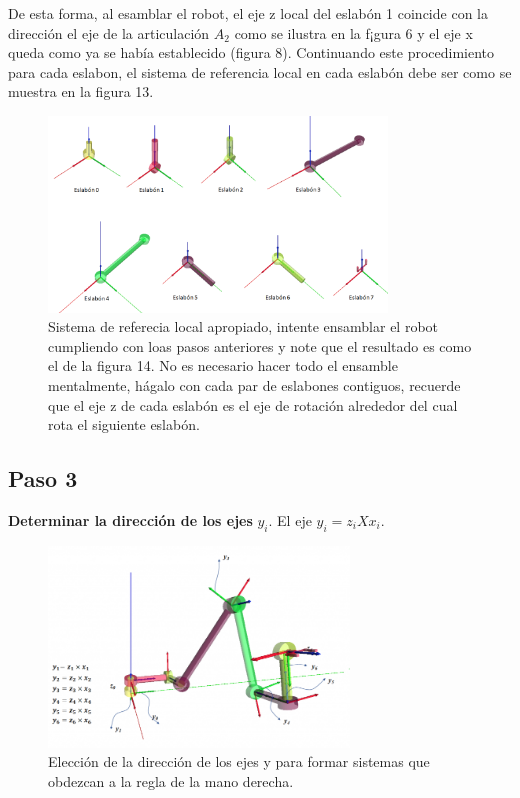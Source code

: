 \documentclass[12pt,a4paper]{report}
\begin{document}
De esta forma, al esamblar el robot,  el eje z local del eslabón 1 coincide con la dirección el eje de la articulación $A_{2}$ como se ilustra en la f¡gura 6 y el eje x queda como ya se había establecido (figura 8). Continuando este procedimiento para cada eslabon, el sistema de referencia local en cada eslabón debe ser como se muestra en la figura 13.

\begin{figure}[hbtp]
\centering
\includegraphics[width=9cm]{13.png}
\caption{Sistema de referecia local apropiado, intente ensamblar el robot cumpliendo con loas pasos anteriores y note que el resultado es como el de la figura 14. No es necesario hacer todo el ensamble mentalmente, hágalo con cada par de eslabones contiguos, recuerde que el eje z de cada eslabón es el eje de rotación alrededor del cual rota el siguiente eslabón.}
\end{figure}
\subsection{Paso 3}
\textbf{Determinar la dirección de los ejes} $y_{i}$.
El eje $y_{i}=z_{i}X x_{i}$.
\begin{figure}[hbtp]
\centering
\includegraphics[width=8cm]{14.png}
\caption{Elección de la dirección de los ejes y para formar sistemas que obdezcan a la regla de la mano derecha.}
\end{figure}
\end{document}
